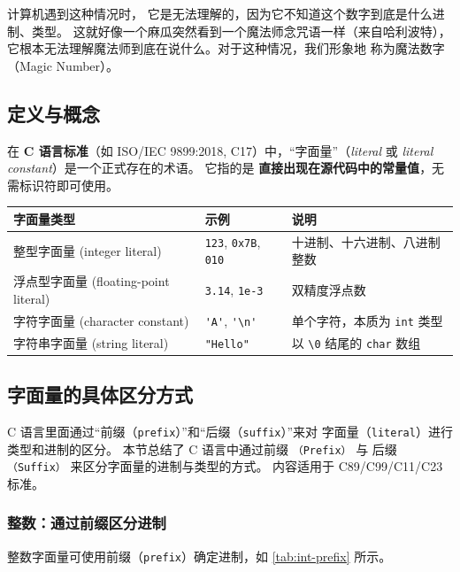 计算机遇到这种情况时，
它是无法理解的，因为它不知道这个数字到底是什么进制、类型。
这就好像一个麻瓜突然看到一个魔法师念咒语一样（来自哈利波特），
它根本无法理解魔法师到底在说什么。对于这种情况，我们形象地
称为魔法数字（Magic Number）。



\subsection{定义与概念}
在 \textbf{C 语言标准}（如 ISO/IEC 9899:2018, C17）中，``字面量''（\textit{literal} 或 \textit{literal constant}）是一个正式存在的术语。  
它指的是 \textbf{直接出现在源代码中的常量值}，无需标识符即可使用。

\begin{center}
\begin{tabular}{lll}
\hline
\textbf{字面量类型} & \textbf{示例} & \textbf{说明} \\
\hline
整型字面量 (integer literal) & \verb|123|, \verb|0x7B|, \verb|010| & 十进制、十六进制、八进制整数 \\
浮点型字面量 (floating-point literal) & \verb|3.14|, \verb|1e-3| & 双精度浮点数 \\
字符字面量 (character constant) & \verb|'A'|, \verb|'\n'| & 单个字符，本质为 \verb|int| 类型 \\
字符串字面量 (string literal) & \verb|"Hello"| & 以 \verb|\0| 结尾的 \verb|char| 数组 \\
\hline
\end{tabular}
\end{center}

\subsection{字面量的具体区分方式}

C 语言里面通过“前缀（\texttt{prefix}）”和“后缀（\texttt{suffix}）”来对
字面量（\texttt{literal}）进行类型和进制的区分。
本节总结了 C 语言中通过前缀 \texttt{（Prefix）} 与
后缀 \texttt{（Suffix）} 来区分字面量的进制与类型的方式。
内容适用于 C89/C99/C11/C23 标准。



\subsubsection{整数：通过前缀区分进制}

整数字面量可使用前缀（\texttt{prefix}）确定进制，如 \autoref{tab:int-prefix} 所示。

